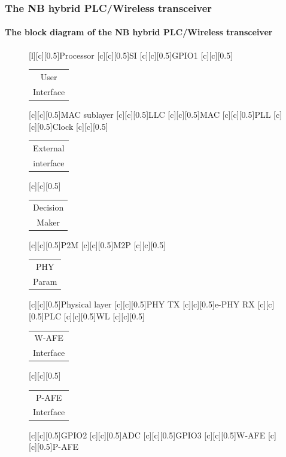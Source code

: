 \documentclass[mathserif]{beamer}
\begin{document}
\begin{frame}
	\frametitle{The NB hybrid PLC/Wireless transceiver}
	\framesubtitle{The block diagram of the NB hybrid PLC/Wireless transceiver}
	\renewcommand{\sizeLetter}{0.5}
	\begin{figure}[htb]
		\centering
		[\sizeLetter]{Processor}
		[\sizeLetter]{SI}
		[\sizeLetter]{GPIO1}
		[\sizeLetter]{\begin{tabular}{@{}c@{}}
				User\\ 
				Interface
		\end{tabular} }
		[\sizeLetter]{MAC sublayer}
		[\sizeLetter]{LLC}
		[\sizeLetter]{MAC}
		[\sizeLetter]{PLL}
		[\sizeLetter]{Clock}
		[\sizeLetter]{\begin{tabular}{@{}c@{}}
				External\\ 
				interface\\ 
		\end{tabular} }
		[\sizeLetter]{\begin{tabular}{@{}c@{}}
				Decision\\ 
				Maker\\ 
		\end{tabular} }
		[\sizeLetter]{P2M}
		[\sizeLetter]{M2P}
		[\sizeLetter]{\begin{tabular}{@{}c@{}}
				PHY\\ 
				Param\\ 
		\end{tabular} }
		[\sizeLetter]{Physical layer}
		[\sizeLetter]{PHY TX}
		[\sizeLetter]{e-PHY RX}
		[\sizeLetter]{PLC}
		[\sizeLetter]{WL}
		[\sizeLetter]{\begin{tabular}{@{}c@{}}
				W-AFE\\
				Interface\\ 
		\end{tabular} }
		[\sizeLetter]{\begin{tabular}{@{}c@{}}
				P-AFE\\
				Interface\\ 
		\end{tabular} }
		[\sizeLetter]{GPIO2}
		[\sizeLetter]{ADC}
		[\sizeLetter]{GPIO3}
		[\sizeLetter]{W-AFE}
		[\sizeLetter]{P-AFE}

\end{figure}
\end{frame}
\end{document}
